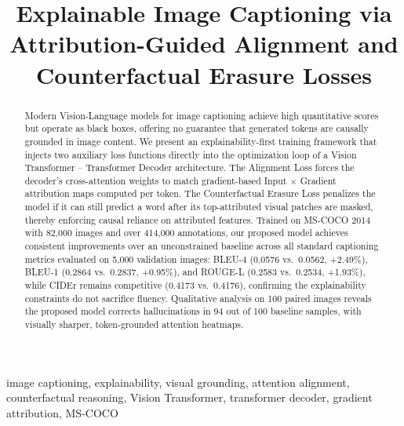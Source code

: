 \documentclass[conference]{IEEEtran}
\begin{document}
\title{Explainable Image Captioning via Attribution-Guided Alignment and Counterfactual Erasure Losses}

\author{
}

\maketitle

\begin{abstract}
Modern Vision-Language models for image captioning achieve high quantitative scores but operate as black boxes, offering no guarantee that generated tokens are causally grounded in image content. We present an explainability-first training framework that injects two auxiliary loss functions directly into the optimization loop of a Vision Transformer -- Transformer Decoder architecture. The Alignment Loss forces the decoder's cross-attention weights to match gradient-based Input $\times$ Gradient attribution maps computed per token. The Counterfactual Erasure Loss penalizes the model if it can still predict a word after its top-attributed visual patches are masked, thereby enforcing causal reliance on attributed features. Trained on MS-COCO 2014 with 82,000 images and over 414,000 annotations, our proposed model achieves consistent improvements over an unconstrained baseline across all standard captioning metrics evaluated on 5,000 validation images: BLEU-4 (0.0576 vs.\ 0.0562, +2.49\%), BLEU-1 (0.2864 vs.\ 0.2837, +0.95\%), and ROUGE-L (0.2583 vs.\ 0.2534, +1.93\%), while CIDEr remains competitive (0.4173 vs.\ 0.4176), confirming the explainability constraints do not sacrifice fluency. Qualitative analysis on 100 paired images reveals the proposed model corrects hallucinations in 94 out of 100 baseline samples, with visually sharper, token-grounded attention heatmaps.
\end{abstract}

\begin{IEEEkeywords}
image captioning, explainability, visual grounding, attention alignment, counterfactual reasoning, Vision Transformer, transformer decoder, gradient attribution, MS-COCO
\end{IEEEkeywords}
\end{document}
